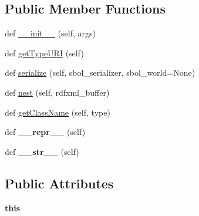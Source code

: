 \subsection*{Public Member Functions}
\begin{DoxyCompactItemize}
\item 
def \hyperlink{classsbol_1_1libsbol_1_1_s_b_o_l_object_a28ad02e95f0e7cbbe3d602726c8e9f4a}{\+\_\+\+\_\+init\+\_\+\+\_\+} (self, args)
\item 
def \hyperlink{classsbol_1_1libsbol_1_1_s_b_o_l_object_a0f432bb4970ca81886d5138211889706}{get\+Type\+U\+RI} (self)
\item 
def \hyperlink{classsbol_1_1libsbol_1_1_s_b_o_l_object_a4540642f2088dfc567724b62804ca565}{serialize} (self, sbol\+\_\+serializer, sbol\+\_\+world=None)
\item 
def \hyperlink{classsbol_1_1libsbol_1_1_s_b_o_l_object_a2aa7275cf01c56b112ea9dba20fca185}{nest} (self, rdfxml\+\_\+buffer)
\item 
def \hyperlink{classsbol_1_1libsbol_1_1_s_b_o_l_object_a17bd27ccb1e0b383eff0db940ad2a18b}{get\+Class\+Name} (self, type)
\item 
def {\bfseries \+\_\+\+\_\+repr\+\_\+\+\_\+} (self)\hypertarget{classsbol_1_1libsbol_1_1_s_b_o_l_object_ade31d7264979c1f136f0c68b376760f8}{}\label{classsbol_1_1libsbol_1_1_s_b_o_l_object_ade31d7264979c1f136f0c68b376760f8}

\item 
def {\bfseries \+\_\+\+\_\+str\+\_\+\+\_\+} (self)\hypertarget{classsbol_1_1libsbol_1_1_s_b_o_l_object_a4d075956912053ac0b22700924d1fded}{}\label{classsbol_1_1libsbol_1_1_s_b_o_l_object_a4d075956912053ac0b22700924d1fded}

\end{DoxyCompactItemize}
\subsection*{Public Attributes}
\begin{DoxyCompactItemize}
\item 
{\bfseries this}\hypertarget{classsbol_1_1libsbol_1_1_s_b_o_l_object_ab6fd35f2ee439159a94765fd116ede51}{}\label{classsbol_1_1libsbol_1_1_s_b_o_l_object_ab6fd35f2ee439159a94765fd116ede51}

\end{DoxyCompactItemize}
